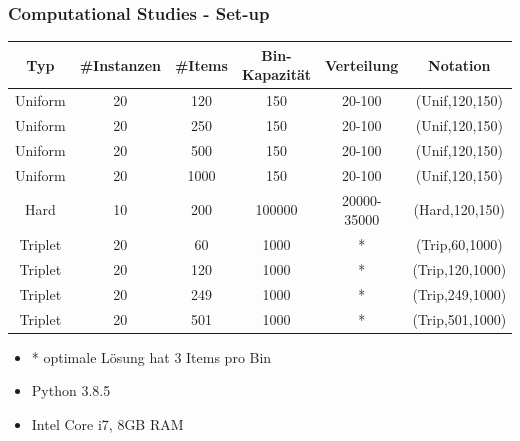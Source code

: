 \documentclass{beamer}
\begin{document}
%
\begin{frame}
\frametitle{Computational Studies - Set-up}

\begin{table}
\begin{footnotesize}
\begin{tabular}{c c c c c c}
\toprule
\textbf{Typ} & \textbf{\#Instanzen} & \textbf{\#Items} & \textbf{Bin-Kapazität} & \textbf{Verteilung} & \textbf{Notation}\\
\midrule
Uniform  & 20   & 120 & 150 & 20-100 & (Unif,120,150) \\
Uniform  & 20   & 250 & 150 & 20-100 & (Unif,120,150) \\
Uniform  & 20   & 500 & 150 & 20-100 & (Unif,120,150) \\
Uniform  & 20   & 1000 & 150 & 20-100 & (Unif,120,150) \\\midrule
Hard  & 10   & 200 & 100000 & 20000-35000 & (Hard,120,150) \\\midrule
Triplet  & 20   & 60 & 1000 & * & (Trip,60,1000) \\
Triplet  & 20   & 120 & 1000 & * & (Trip,120,1000) \\
Triplet  & 20   & 249 & 1000 & * & (Trip,249,1000) \\
Triplet  & 20   & 501 & 1000 & * & (Trip,501,1000) \\
\bottomrule
\end{tabular}
\end{footnotesize}
\end{table}
\begin{footnotesize}
\begin{itemize}
\item * optimale Lösung hat 3 Items pro Bin
\item Python 3.8.5
\item Intel Core i7, 8GB RAM
\end{itemize}
\end{footnotesize}

\end{frame}
\end{document}
